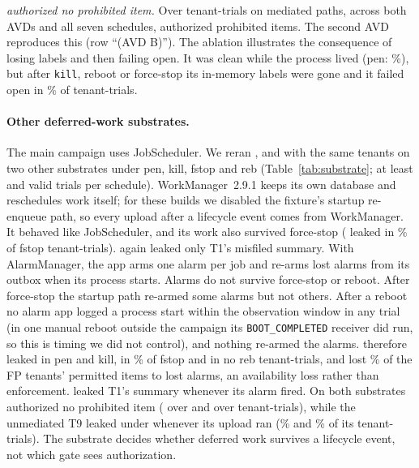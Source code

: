 \emph{\sys authorized no prohibited item.} Over \rdTenantTrials{} tenant-trials on mediated paths, across both AVDs and all
seven schedules, \sys authorized \rdItems{} prohibited items. The second AVD reproduces this (row ``\sys (AVD B)''). The
 ablation illustrates the consequence of losing labels and then failing open. It was clean while the process lived (\textsf{pen}:
\volatilePenPct{}\%), but after \texttt{kill}, reboot or force-stop its in-memory labels were gone and it failed open in
\volatileLifePct{}\% of tenant-trials.

\paragraph{Other deferred-work substrates.}
\label{sec:eval-substrate}
The main campaign uses JobScheduler. We reran ,  and \sys with the same tenants on two other
substrates under \textsf{pen}, \textsf{kill}, \textsf{fstop} and \textsf{reb} (Table~\ref{tab:substrate}; at least
\subWorkManagerMinPerSched{} and \subAlarmManagerMinPerSched{} valid trials per schedule). WorkManager~2.9.1 keeps its own
database and reschedules work itself; for these builds we disabled the fixture's startup re-enqueue path, so every upload
after a lifecycle event comes from WorkManager. It behaved like JobScheduler, and its work also survived force-stop
( leaked in \subWorkManagerNoneForcestop{}\% of \textsf{fstop} tenant-trials).  again leaked only
T1's misfiled summary. With AlarmManager, the app arms one alarm per job and re-arms lost alarms from its outbox when its
process starts. Alarms do not survive force-stop or reboot. After force-stop the startup path re-armed some alarms but not
others. After a reboot no alarm app logged a process start within the observation window in any trial (in one manual
reboot outside the campaign its \texttt{BOOT\_COMPLETED} receiver did run, so this is timing we did not control), and nothing
re-armed the alarms.  therefore leaked in \textsf{pen} and \textsf{kill}, in \subAlarmManagerNoneForcestop{}\%
of \textsf{fstop} and in no \textsf{reb} tenant-trials, and lost \subAlarmManagerNoneDefPct{}\% of the FP tenants' permitted
items to lost alarms, an availability loss rather than enforcement.  leaked T1's summary whenever its alarm fired. On both substrates \sys authorized no prohibited item
(\subWorkManagerRdItems{} over \subWorkManagerRdTT{} and \subAlarmManagerRdItems{} over \subAlarmManagerRdTT{} tenant-trials),
while the unmediated T9 leaked under \sys whenever its upload ran (\subWorkManagerRdTNinePct{}\% and
\subAlarmManagerRdTNinePct{}\% of its tenant-trials). The substrate decides whether deferred work survives a lifecycle
event, not which gate sees authorization.

